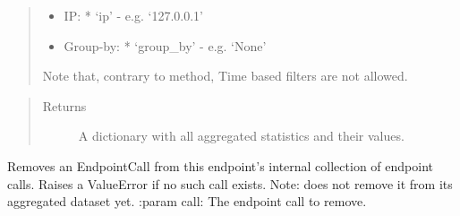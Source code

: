 \documentclass[letterpaper,10pt,english]{sphinxmanual}
\begin{document}
\begin{fulllineitems}
\begin{fulllineitems}
\begin{quote}
\begin{description}
\begin{itemize}
\item {} 
IP:
* ‘ip’ - e.g. ‘127.0.0.1’

\item {} 
Group-by:
* ‘group\_by’ - e.g. ‘None’

\end{itemize}

Note that, contrary to  method, Time based filters are not allowed.

\end{description}
\end{quote}
\begin{quote}\begin{description}
\item[{Returns}] \leavevmode
A dictionary with all aggregated statistics and their values.

\end{description}\end{quote}

\end{fulllineitems}


\begin{fulllineitems}
\label{\detokenize{pydash_app.dashboard.endpoint:pydash_app.dashboard.endpoint.Endpoint.get_id}}
\end{fulllineitems}


\begin{fulllineitems}
\label{\detokenize{pydash_app.dashboard.endpoint:pydash_app.dashboard.endpoint.Endpoint.remove_endpoint_call}}
Removes an EndpointCall from this endpoint’s internal collection of endpoint calls.
Raises a ValueError if no such call exists.
Note: does not remove it from its aggregated dataset yet.
:param call: The endpoint call to remove.

\end{fulllineitems}


\begin{fulllineitems}
\label{\detokenize{pydash_app.dashboard.endpoint:pydash_app.dashboard.endpoint.Endpoint.set_monitored}}
\end{fulllineitems}


\end{fulllineitems}
\end{document}
